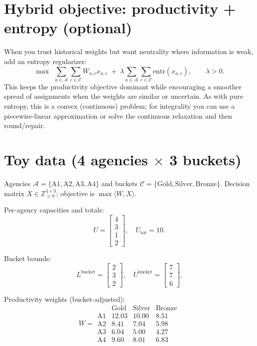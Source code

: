 \documentclass[11pt]{article}
\newcommand{\A}{\mathcal{A}}                 %
\newcommand{\C}{\mathcal{C}}                 %
\begin{document}
\section{Hybrid objective: productivity + entropy (optional)}
When you trust historical weights but want neutrality where information is weak, add
an entropy regularizer:
\[
\max\ \ \sum_{a\in\A}\sum_{c\in\C} W_{a,c}x_{a,c}\;+\;\lambda\sum_{a\in\A}\sum_{c\in\C}\mathrm{entr}(x_{a,c}),
\qquad \lambda>0.
\]
This keeps the productivity objective dominant while encouraging a smoother spread
of assignments when the weights are similar or uncertain. As with pure entropy,
this is a convex (continuous) problem; for integrality you can use a piecewise-linear
approximation or solve the continuous relaxation and then round/repair.

\section*{Toy data (4 agencies $\times$ 3 buckets)}
Agencies $\A=\{\mathrm{A1},\mathrm{A2},\mathrm{A3},\mathrm{A4}\}$ and buckets
$\C=\{\mathrm{Gold},\mathrm{Silver},\mathrm{Bronze}\}$. Decision matrix
$X\in\mathbb{Z}_{\ge 0}^{4\times 3}$; objective is $\max\langle W,X\rangle$.

Per-agency capacities and totals:
\[
U=\begin{bmatrix}4\\[2pt]3\\[2pt]1\\[2pt]2\end{bmatrix},
\quad
U_{\mathrm{tot}}=10.
\]

Bucket bounds:
\[
L^{\text{bucket}}=\begin{bmatrix}2\\[2pt]3\\[2pt]2\end{bmatrix},\quad
U^{\text{bucket}}=\begin{bmatrix}7\\[2pt]7\\[2pt]6\end{bmatrix}.
\]

Productivity weights (bucket-adjusted):
\[
W=
\begin{array}{c|ccc}
 & \text{Gold} & \text{Silver} & \text{Bronze} \\\hline
\text{A1} & 12.03 & 10.00 & 8.51 \\
\text{A2} & 8.41 & 7.04 & 5.98 \\
\text{A3} & 6.04 & 5.00 & 4.27 \\
\text{A4} & 9.60 & 8.01 & 6.83
\end{array}
\]
\end{document}
